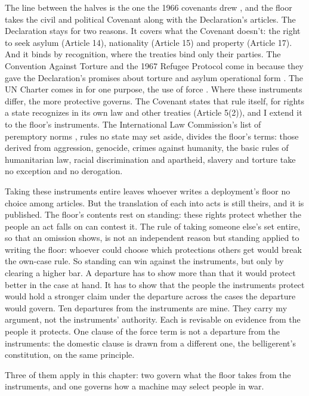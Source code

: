 The line between the halves is the one the 1966 covenants drew \autocite{un1966iccpr,un1966icescr}, and the floor takes the civil and political Covenant along with the Declaration's articles. The Declaration stays for two reasons. It covers what the Covenant doesn't: the right to seek asylum (Article 14), nationality (Article 15) and property (Article 17). And it binds by recognition, where the treaties bind only their parties. The Convention Against Torture and the 1967 Refugee Protocol come in because they gave the Declaration's promises about torture and asylum operational form \autocite{un1984cat,un1967protocol}. The UN Charter comes in for one purpose, the use of force \autocite{un1945charter}. Where these instruments differ, the more protective governs. The Covenant states that rule itself, for rights a state recognizes in its own law and other treaties (Article 5(2)), and I extend it to the floor's instruments. The International Law Commission's list of peremptory norms \autocite{ilc2022jus}, rules no state may set aside, divides the floor's terms: those derived from aggression, genocide, crimes against humanity, the basic rules of humanitarian law, racial discrimination and apartheid, slavery and torture take no exception and no derogation.

Taking these instruments entire leaves whoever writes a deployment's floor no choice among articles. But the translation of each into acts is still theirs, and it is published. The floor's contents rest on standing: these rights protect whether the people an act falls on can contest it. The rule of taking someone else's set entire, so that an omission shows, is not an independent reason but standing applied to writing the floor: whoever could choose which protections others get would break the own-case rule. So standing can win against the instruments, but only by clearing a higher bar. A departure has to show more than that it would protect better in the case at hand. It has to show that the people the instruments protect would hold a stronger claim under the departure across the cases the departure would govern. Ten departures from the instruments are mine. They carry my argument, not the instruments' authority. Each is revisable on evidence from the people it protects. One clause of the force term is not a departure from the instruments: the domestic clause is drawn from a different one, the belligerent's constitution, on the same principle.

Three of them apply in this chapter: two govern what the floor takes from the instruments, and one governs how a machine may select people in war.

